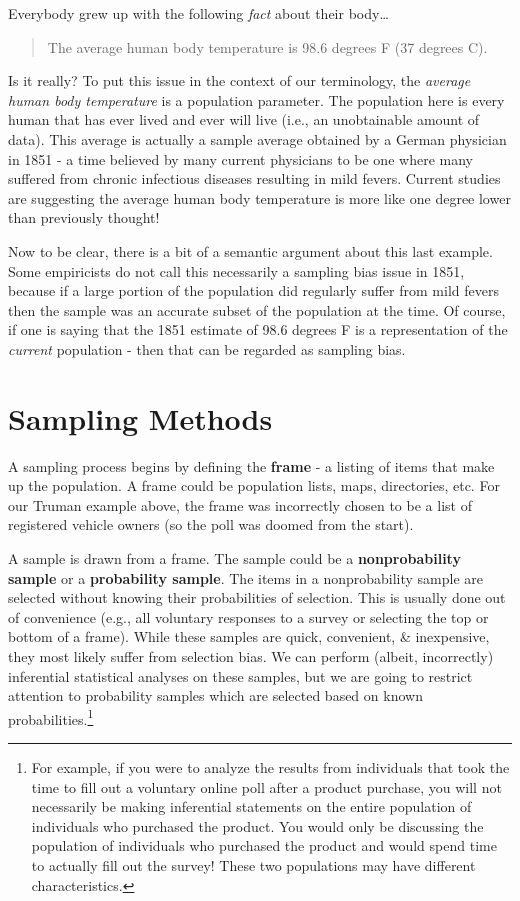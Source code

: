 \documentclass[
]{book}
\begin{document}
Everybody grew up with the following \emph{fact} about their body\ldots{}

\begin{quote}
The average human body temperature is 98.6 degrees F (37 degrees C).
\end{quote}

Is it really? To put this issue in the context of our terminology, the \emph{average human body temperature} is a population parameter. The population here is every human that has ever lived and ever will live (i.e., an unobtainable amount of data). This average is actually a sample average obtained by a German physician in 1851 - a time believed by many current physicians to be one where many suffered from chronic infectious diseases resulting in mild fevers. Current studies are suggesting the average human body temperature is more like one degree lower than previously thought!

Now to be clear, there is a bit of a semantic argument about this last example. Some empiricists do not call this necessarily a sampling bias issue in 1851, because if a large portion of the population did regularly suffer from mild fevers then the sample was an accurate subset of the population at the time. Of course, if one is saying that the 1851 estimate of 98.6 degrees F is a representation of the \emph{current} population - then that can be regarded as sampling bias.

\hypertarget{sampling-methods}{%
\section{Sampling Methods}\label{sampling-methods}}

A sampling process begins by defining the \textbf{frame} - a listing of items that make up the population. A frame could be population lists, maps, directories, etc. For our Truman example above, the frame was incorrectly chosen to be a list of registered vehicle owners (so the poll was doomed from the start).

A sample is drawn from a frame. The sample could be a \textbf{nonprobability sample} or a \textbf{probability sample}. The items in a nonprobability sample are selected without knowing their probabilities of selection. This is usually done out of convenience (e.g., all voluntary responses to a survey or selecting the top or bottom of a frame). While these samples are quick, convenient, \& inexpensive, they most likely suffer from selection bias. We can perform (albeit, incorrectly) inferential statistical analyses on these samples, but we are going to restrict attention to probability samples which are selected based on known probabilities.\footnote{For example, if you were to analyze the results from individuals that took the time to fill out a voluntary online poll after a product purchase, you will not necessarily be making inferential statements on the entire population of individuals who purchased the product. You would only be discussing the population of individuals who purchased the product and would spend time to actually fill out the survey! These two populations may have different characteristics.}
\end{document}
